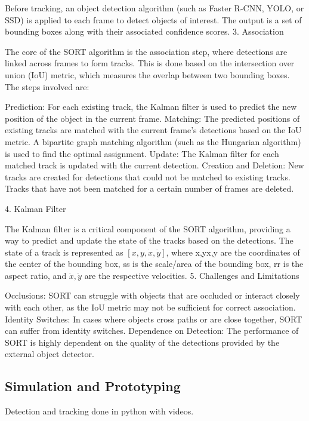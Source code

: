 Before tracking, an object detection algorithm (such as Faster R-CNN, YOLO, or SSD) is applied to each frame to detect objects of interest. The output is a set of bounding boxes along with their associated confidence scores.
3. Association

The core of the SORT algorithm is the association step, where detections are linked across frames to form tracks. This is done based on the intersection over union (IoU) metric, which measures the overlap between two bounding boxes. The steps involved are:

Prediction: For each existing track, the Kalman filter is used to predict the new position of the object in the current frame.
Matching: The predicted positions of existing tracks are matched with the current frame's detections based on the IoU metric. A bipartite graph matching algorithm (such as the Hungarian algorithm) is used to find the optimal assignment.
Update: The Kalman filter for each matched track is updated with the current detection.
Creation and Deletion: New tracks are created for detections that could not be matched to existing tracks. Tracks that have not been matched for a certain number of frames are deleted.

4. Kalman Filter

The Kalman filter is a critical component of the SORT algorithm, providing a way to predict and update the state of the tracks based on the detections. The state of a track is represented as $[x,y,\dot{x},\dot{y}]$, where x,yx,y are the coordinates of the center of the bounding box, ss is the scale/area of the bounding box, rr is the aspect ratio, and $\dot{x},\dot{y}$ are the respective velocities.
5. Challenges and Limitations

Occlusions: SORT can struggle with objects that are occluded or interact closely with each other, as the IoU metric may not be sufficient for correct association.
Identity Switches: In cases where objects cross paths or are close together, SORT can suffer from identity switches.
Dependence on Detection: The performance of SORT is highly dependent on the quality of the detections provided by the external object detector.




\subsection{Simulation and Prototyping}
Detection and tracking done in python with videos.



